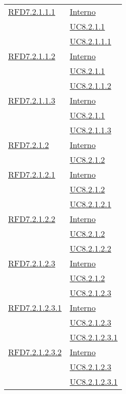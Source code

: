 \begin{longtable}{|>{\centering}m{5cm}|m{5cm}<{\centering}|}
\hyperlink{RFD7.2.1.1.1}{RFD7.2.1.1.1} & \hyperlink{Interno}{Interno}\\
& \hyperref[UC8.2.1.1]{UC8.2.1.1}\\
& \hyperref[UC8.2.1.1.1]{UC8.2.1.1.1}\\ \hline

\hyperlink{RFD7.2.1.1.2}{RFD7.2.1.1.2} & \hyperlink{Interno}{Interno}\\
& \hyperref[UC8.2.1.1]{UC8.2.1.1}\\
& \hyperref[UC8.2.1.1.2]{UC8.2.1.1.2}\\ \hline

\hyperlink{RFD7.2.1.1.3}{RFD7.2.1.1.3} & \hyperlink{Interno}{Interno}\\
& \hyperref[UC8.2.1.1]{UC8.2.1.1}\\
& \hyperref[UC8.2.1.1.3]{UC8.2.1.1.3}\\ \hline

\hyperlink{RFD7.2.1.2}{RFD7.2.1.2} & \hyperlink{Interno}{Interno}\\
& \hyperref[UC8.2.1.2]{UC8.2.1.2}\\ \hline

\hyperlink{RFD7.2.1.2.1}{RFD7.2.1.2.1} & \hyperlink{Interno}{Interno}\\
& \hyperref[UC8.2.1.2]{UC8.2.1.2}\\
& \hyperref[UC8.2.1.2.1]{UC8.2.1.2.1}\\ \hline

\hyperlink{RFD7.2.1.2.2}{RFD7.2.1.2.2} & \hyperlink{Interno}{Interno}\\
& \hyperref[UC8.2.1.2]{UC8.2.1.2}\\
& \hyperref[UC8.2.1.2.2]{UC8.2.1.2.2}\\ \hline

\hyperlink{RFD7.2.1.2.3}{RFD7.2.1.2.3} & \hyperlink{Interno}{Interno}\\
& \hyperref[UC8.2.1.2]{UC8.2.1.2}\\
& \hyperref[UC8.2.1.2.3]{UC8.2.1.2.3}\\ \hline

\hyperlink{RFD7.2.1.2.3.1}{RFD7.2.1.2.3.1} & \hyperlink{Interno}{Interno}\\
& \hyperref[UC8.2.1.2.3]{UC8.2.1.2.3}\\
& \hyperref[UC8.2.1.2.3.1]{UC8.2.1.2.3.1}\\ \hline

\hyperlink{RFD7.2.1.2.3.2}{RFD7.2.1.2.3.2} & \hyperlink{Interno}{Interno}\\
& \hyperref[UC8.2.1.2.3]{UC8.2.1.2.3}\\
& \hyperref[UC8.2.1.2.3.1]{UC8.2.1.2.3.1}\\ \hline


\end{longtable}
